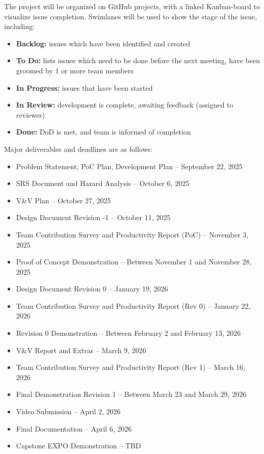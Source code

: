 \documentclass{article}
\begin{document}
The project will be organized on GitHub projects, with a linked Kanban-board to visualize issue completion. Swimlanes will be used to show the stage of the issue, including:

\begin{itemize}
    \item \textbf{Backlog:} issues which have been identified and created
    \item \textbf{To Do:} lists issues which need to be done before the next meeting, have been groomed by 1 or more team members
    \item \textbf{In Progress:} issues that have been started
    \item \textbf{In Review:} development is complete, awaiting feedback (assigned to reviewer)
    \item \textbf{Done:} DoD is met, and team is informed of completion
\end{itemize}

Major deliverables and deadlines are as follows:

\begin{itemize}
    \item Problem Statement, PoC Plan, Development Plan – September 22, 2025
    \item SRS Document and Hazard Analysis – October 6, 2025
    \item V\&V Plan – October 27, 2025
    \item Design Document Revision -1 – October 11, 2025
    \item Team Contribution Survey and Productivity Report (PoC) – November 3, 2025
    \item Proof of Concept Demonstration – Between November 1 and November 28, 2025
    \item Design Document Revision 0 – January 19, 2026
    \item Team Contribution Survey and Productivity Report (Rev 0) – January 22, 2026
    \item Revision 0 Demonstration – Between February 2 and February 13, 2026
    \item V\&V Report and Extras – March 9, 2026
    \item Team Contribution Survey and Productivity Report (Rev 1) – March 16, 2026
    \item Final Demonstration Revision 1 – Between March 23 and March 29, 2026
    \item Video Submission – April 2, 2026
    \item Final Documentation – April 6, 2026
    \item Capstone EXPO Demonstration – TBD
\end{itemize}
\end{document}
